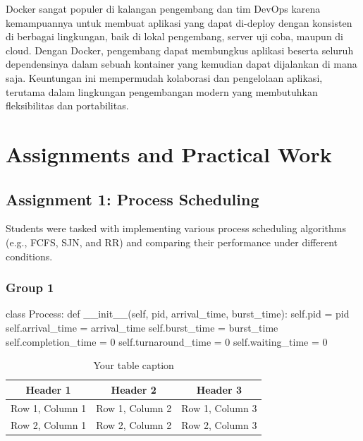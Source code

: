\documentclass[12pt]{article}
\begin{document}
\begin{enumerate}
    Docker sangat populer di kalangan pengembang dan tim DevOps karena kemampuannya untuk membuat aplikasi yang dapat di-deploy dengan konsisten di berbagai lingkungan, baik di lokal pengembang, server uji coba, maupun di cloud. Dengan Docker, pengembang dapat membungkus aplikasi beserta seluruh dependensinya dalam sebuah kontainer yang kemudian dapat dijalankan di mana saja. Keuntungan ini mempermudah kolaborasi dan pengelolaan aplikasi, terutama dalam lingkungan pengembangan modern yang membutuhkan fleksibilitas dan portabilitas.
\end{enumerate}

\section{Assignments and Practical Work}
\subsection{Assignment 1: Process Scheduling}
Students were tasked with implementing various process scheduling algorithms (e.g., FCFS, SJN, and RR) and comparing their performance under different conditions.
\subsubsection{Group 1}
\begin{python}
    class Process:
    def __init__(self, pid, arrival_time, burst_time):
        self.pid = pid
        self.arrival_time = arrival_time
        self.burst_time = burst_time
        self.completion_time = 0
        self.turnaround_time = 0
        self.waiting_time = 0
\end{python}

\begin{table}[htbp] %
    \centering
    \begin{tabular}{|c|c|c|} %
    \hline
    Header 1 & Header 2 & Header 3 \\ %
    \hline
    Row 1, Column 1 & Row 1, Column 2 & Row 1, Column 3 \\ %
    \hline
    Row 2, Column 1 & Row 2, Column 2 & Row 2, Column 3 \\ %
    \hline
    \end{tabular}
    \caption{Your table caption} %
    \label{tab:your_label} %
\end{table}
\end{document}
